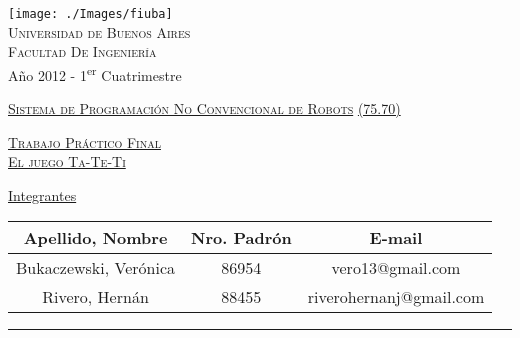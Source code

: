 \documentclass[12pt,titlepage]{article}
\begin{document}
\begin{titlepage}

\thispagestyle{empty}

\begin{center}
\texttt{[image: ./Images/fiuba]}\\
\large{\textsc{Universidad de Buenos Aires}}\\
\large{\textsc{Facultad De Ingeniería}}\\
\small{Año 2012 - 1\textsuperscript{er} Cuatrimestre}
\end{center}

\vfill

\begin{center}

\Large{\underline{\textsc{Sistema de Programaci\'on No Convencional de Robots}}}
\Large{\underline{\textsc{(75.70)}}}

\vfill


\Large{\underline{\textsc{Trabajo Pr\'actico Final}}} \\
\Large{\underline{\textsc{El juego Ta-Te-Ti}}}
\vfill
 
\Large\underline{Integrantes} \linebreak\linebreak

\large\addtolength{\tabcolsep}{-3pt}
\begin{tabular}{|| c | c | c ||}
\hline
\textbf{Apellido, Nombre} & \textbf{Nro. Padrón} & \textbf{E-mail} \\
\hline
Bukaczewski, Verónica & 86954 & vero13@gmail.com \\
\hline
Rivero, Hern\'an & 88455 & riverohernanj@gmail.com \\
\hline
\end{tabular}
\end{center}

\vfill

\hrule
\vspace{0.2cm}


\end{titlepage}

\end{document}
